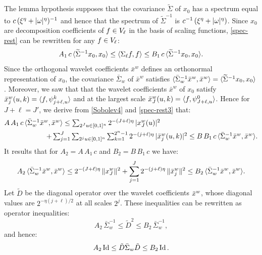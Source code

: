\documentclass{article}
\begin{document}
The lemma hypothesis supposes that the covariance $\widetilde \Sigma$ of $x_0$
has a spectrum equal to $c\, (\xi^\eta + |{\omega}|^\eta)^{-1}$ and hence that the
spectrum of $\widetilde \Sigma^{-1}$ is $c^{-1}\, (\xi^\eta + |{\omega}|^\eta)$.
Since $x_0$ are decomposition coefficients of $f \in V_\ell$ in the basis of
scaling functions, \eqref{spec-rest} can be rewritten for any $f \in V_\ell$:
\begin{equation}
    \label{spec-rest3}
A_1\,c\,{\langle}  \widetilde \Sigma^{-1} x_0 , x_0{\rangle} \leq {\langle}  \Sigma_\ell f , f {\rangle}
\leq B_1\, c \,{\langle}  \widetilde \Sigma^{-1} x_0 , x_0{\rangle} .
\end{equation}
Since the orthogonal wavelet coefficients $\bar x^w$ defines an orthonormal representation
of $x_0$, the covariance $\bar \Sigma_w$ of $\bar x^w$ satisfies
$ {\langle} \bar \Sigma_w^{-1} \bar x^w , \bar x^w{\rangle} = 
{\langle}  \widetilde \Sigma^{-1} x_0 , x_0{\rangle} $. 
Moreover, we saw that that the wavelet coefficients $\bar x^w$ of $x_0$ satisfy
${\bar x}^w_j (u,k) = {\langle} f , \psi^k_{j+\ell,u}{\rangle}$ and at the largest scale
${\bar x}^w_J (u,k) = {\langle} f , \psi^0_{J+\ell,u}{\rangle}$. Hence for $J +\ell = J'$,
we derive from
\eqref{Sobolev4} and \eqref{spec-rest3} that:
\begin{align}
  \label{Sobolev}
&\textstyle{A\,A_1\,c\, {\langle}\bar \Sigma_w^{-1} \bar x^w , \bar x^w {\rangle}\leq 
  \sum_{2^J u\in [0,1]^n} 2^{-(J+\ell) \eta} \,| x^w_J (u)|^2 }
\\ & \qquad \qquad \qquad \textstyle{+
 \sum_{j=1}^J \sum_{2^j u \in [0,1]^n} \sum_{k=1}^{2^n-1}
2^{-(j+\ell) \eta}\, |{\bar x}^w_j (u,k)|^2 \leq 
B\,B_1\,c\, {\langle}\bar \Sigma_w^{-1} \bar x^w , \bar x^w {\rangle}.}
\end{align}
It results that for $A_2 = A\,A_1\,c$ and $B_2 = B\,B_1\,c$ we have:
\begin{equation}
    \label{nonsdf0asd}
A_2\,{\langle} \bar \Sigma_w ^{-1}\bar x^w , \bar x^w {\rangle} \leq
2^{-(J+\ell) \eta}\, \|x^w_J \|^2 + \sum_{j=1}^J
2^{-(j+\ell) \eta}\, \|{\bar x}_j^w \|^2
\leq B_2\,{\langle} \bar \Sigma_w^{-1} \bar x^w , \bar x^w {\rangle} .
\end{equation}
Let $\tilde D$ be the diagonal operator over the wavelet coefficients ${\bar x}^w$,
whose diagonal values are $2^{-\eta (j+\ell)/2}$ at all scales $2^j$.
These inequalities can be rewritten as operator inequalities:
\begin{equation}
    \label{nonsdf0asd2}
A_2 \,\bar \Sigma_w^{-1} \leq \tilde D^{2} \leq B_2\, \bar \Sigma_w^{-1},
\end{equation}
and hence:
\begin{equation}
  \label{Dinequal0}
A_2 \operatorname{Id} \leq \tilde D \bar \Sigma_w \tilde D \leq B_2 \operatorname{Id} .
\end{equation}
\end{document}
